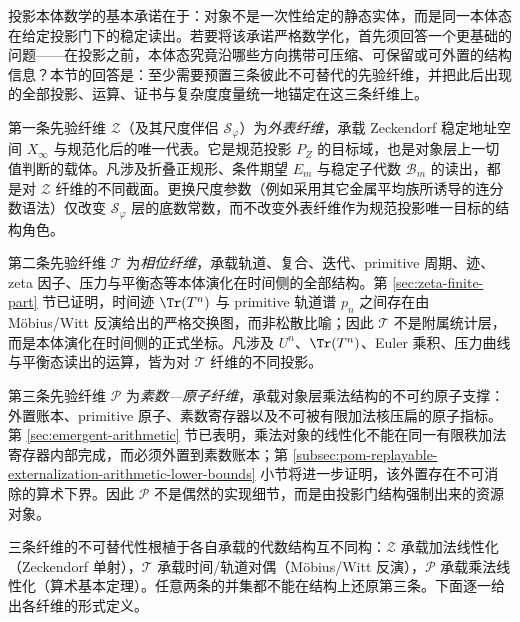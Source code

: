 投影本体数学的基本承诺在于：对象不是一次性给定的静态实体，而是同一本体态在给定投影门下的稳定读出。若要将该承诺严格数学化，首先须回答一个更基础的问题——在投影之前，本体态究竟沿哪些方向携带可压缩、可保留或可外置的结构信息？本节的回答是：至少需要预置三条彼此不可替代的先验纤维，并把此后出现的全部投影、运算、证书与复杂度度量统一地锚定在这三条纤维上。

第一条先验纤维 $\mathcal{Z}$（及其尺度伴侣 $\mathcal{S}_\varphi$）为\emph{外表纤维}，承载 Zeckendorf 稳定地址空间 $X_\infty$ 与规范化后的唯一代表。它是规范投影 $P_Z$ 的目标域，也是对象层上一切值判断的载体。凡涉及折叠正规形、条件期望 $E_m$ 与稳定子代数 $\mathcal{B}_m$ 的读出，都是对 $\mathcal{Z}$ 纤维的不同截面。更换尺度参数（例如采用其它金属平均族所诱导的连分数语法）仅改变 $\mathcal{S}_\varphi$ 层的底数常数，而不改变外表纤维作为规范投影唯一目标的结构角色。

第二条先验纤维 $\mathcal{T}$ 为\emph{相位纤维}，承载轨道、复合、迭代、primitive 周期、迹、zeta 因子、压力与平衡态等本体演化在时间侧的全部结构。第 \ref{sec:zeta-finite-part} 节已证明，时间迹 $\Tr(T^n)$ 与 primitive 轨道谱 $p_n$ 之间存在由 Möbius/Witt 反演给出的严格交换图，而非松散比喻；因此 $\mathcal{T}$ 不是附属统计层，而是本体演化在时间侧的正式坐标。凡涉及 $U^n$、$\Tr(T^n)$、Euler 乘积、压力曲线与平衡态读出的运算，皆为对 $\mathcal{T}$ 纤维的不同投影。

第三条先验纤维 $\mathcal{P}$ 为\emph{素数—原子纤维}，承载对象层乘法结构的不可约原子支撑：外置账本、primitive 原子、素数寄存器以及不可被有限加法核压扁的原子指标。第 \ref{sec:emergent-arithmetic} 节已表明，乘法对象的线性化不能在同一有限秩加法寄存器内部完成，而必须外置到素数账本；第 \ref{subsec:pom-replayable-externalization-arithmetic-lower-bounds} 小节将进一步证明，该外置存在不可消除的算术下界。因此 $\mathcal{P}$ 不是偶然的实现细节，而是由投影门结构强制出来的资源对象。

三条纤维的不可替代性根植于各自承载的代数结构互不同构：$\mathcal{Z}$ 承载加法线性化（Zeckendorf 单射），$\mathcal{T}$ 承载时间/轨道对偶（Möbius/Witt 反演），$\mathcal{P}$ 承载乘法线性化（算术基本定理）。任意两条的并集都不能在结构上还原第三条。下面逐一给出各纤维的形式定义。
